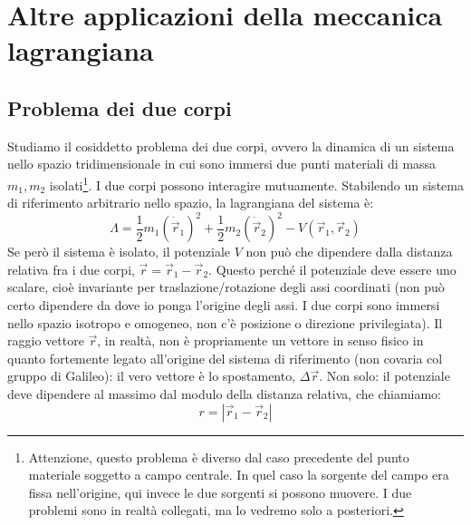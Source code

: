 \documentclass[a4paper,openany]{article}
\begin{document}
	\section{Altre applicazioni della meccanica lagrangiana}
	\subsection{Problema dei due corpi}
	Studiamo il cosiddetto problema dei due corpi, ovvero la dinamica di un sistema nello spazio tridimensionale in cui sono immersi due punti materiali di massa $m_1, m_2$ isolati\footnote{Attenzione, questo problema è diverso dal caso precedente del punto materiale soggetto a campo centrale. In quel caso la sorgente del campo era fissa nell'origine, qui invece le due sorgenti si possono muovere. I due problemi sono in realtà collegati, ma lo vedremo solo a posteriori.}. I due corpi possono interagire mutuamente. Stabilendo un sistema di riferimento arbitrario nello spazio, la lagrangiana del sistema è:
	\begin{equation}\label{key}
		\Lambda=  \dfrac{1}{2}m_1(\dot{\vec{r}}_{1})^{2} + \dfrac{1}{2}m_2(\dot{\vec{r}}_{2})^{2} - V(\vec{r}_1,\vec{r}_2)
	\end{equation}
	Se però il sistema è isolato, il potenziale $V$ non può che dipendere dalla distanza relativa fra i due corpi, $ \vec{r} = \vec{r}_1-\vec{r}_2 $. Questo perché il potenziale deve essere uno scalare, cioè invariante per traslazione/rotazione degli assi coordinati (non può certo dipendere da dove io ponga l'origine degli assi. I due corpi sono immersi nello spazio isotropo e omogeneo, non c'è posizione o direzione privilegiata). Il raggio vettore $\vec{r}$, in realtà, non è propriamente un vettore in senso fisico in quanto fortemente legato all'origine del sistema di riferimento (non covaria col gruppo di Galileo): il vero vettore è lo spostamento, $\Delta \vec{r}$. Non solo: il potenziale deve dipendere al massimo dal modulo della distanza relativa, che chiamiamo:
	$$
	r = |\vec{r}_1-\vec{r}_2|
	$$
	
\end{document}
